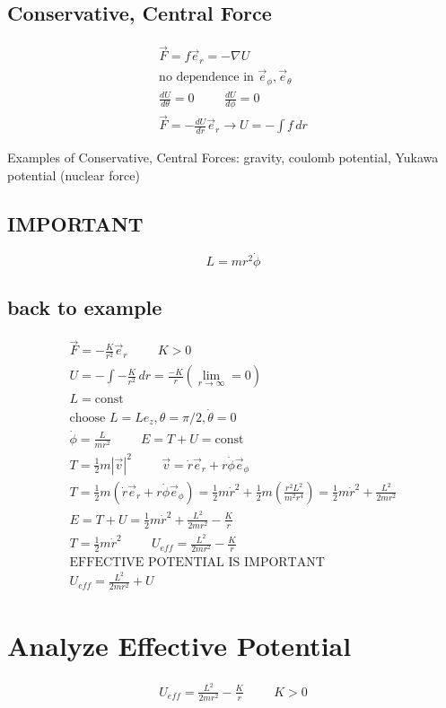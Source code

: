 \documentclass[fleqn]{report}
\newcommand{\hp}{\hspace{1cm}}
\newcommand{\const}{\textrm{const}}
\newcommand{\equations} [1] {
\begin{gather*}
#1
\end{gather*}
}
\begin{document}
\subsection{Conservative, Central Force}
\equations{
    \vec F = f \vec e_r = - \nabla U
    \\
    \textrm{no dependence in $\vec e_\phi, \vec e_\theta$}
    \\
    \frac{dU}{d\theta} = 0 \hp \frac{dU}{d\phi} = 0
    \\
    \vec F = - \frac{dU}{dr} \vec e_r \rightarrow 
    U = - \int f \, dr 
}

Examples of Conservative, Central Forces:
gravity, coulomb potential, Yukawa potential (nuclear force)

\subsection{IMPORTANT}
\[
L =  m r^2 \dot \phi 
\]


\subsection{back to example}
\equations{
    \vec F = - \frac{K}{r^2} \vec e_r \hp K > 0
    \\
    U = - \int -\frac{K}{r^2} \, dr = \frac{-K}{r} (\lim_{r \to \infty} = 0)
    \\
    L = \textrm{const}
    \\
    \textrm{choose $L = L e_z, \theta = \pi/2, \dot \theta = 0$}
    \\
    \dot \phi = \frac{L}{mr^2}
    \hp 
    E = T + U = \const
    \\
    T = \frac{1}{2} m |\vec v|^2 \hp 
    \vec v = \dot r \vec e_r + r \dot \phi \vec e_\phi
    \\
    T = \frac{1}{2} m (\dot r \vec e_r + r \dot \phi \vec e_\phi)
    =
    \frac{1}{2}m \dot r^2 + \frac{1}{2} m \left(\frac{r^2 L^2}{m^2 r^4} \right)
    =
    \frac{1}{2} m \dot r^2 + \frac{L^2}{2 m r^2} 
    \\
    E = T + U
    =
    \frac{1}{2} m \dot r^2 + \frac{L^2}{2 m r^2} - \frac{K}{r}
    \\
    T = \frac{1}{2} m \dot r^2
    \hp 
    U_{eff} = \frac{L^2}{2 m r^2} - \frac{K}{r}
    \\
    \textrm{EFFECTIVE POTENTIAL IS IMPORTANT} 
    \\
    U_{eff} = \frac{L^2}{2 m r^2} + U
}

\section{Analyze Effective Potential}
\equations{
    U_{eff} = \frac{L^2}{2 m r^2} - \frac{K}{r}
    \hp K > 0
}
\end{document}
